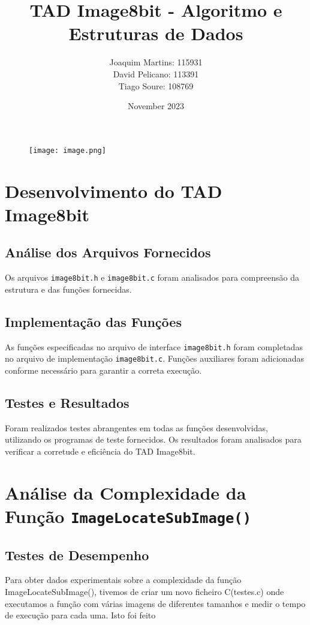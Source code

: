 \documentclass{article}
\title{TAD Image8bit - Algoritmo e Estruturas de Dados}
\author{
  Joaquim Martins: 115931 \\
  David Pelicano: 113391 \\
  Tiago Soure: 108769
}
\date{November 2023}
\begin{document}
\maketitle

\begin{figure}[H]
  \centering
  \texttt{[image: image.png]}
\end{figure}  

\newpage
\renewcommand\contentsname{Índice}
\tableofcontents 
\newpage


\section{Desenvolvimento do TAD Image8bit}

\subsection{Análise dos Arquivos Fornecidos}
Os arquivos \texttt{image8bit.h} e \texttt{image8bit.c} foram analisados para compreensão da estrutura e das funções fornecidas.

\subsection{Implementação das Funções}
As funções especificadas no arquivo de interface \texttt{image8bit.h} foram completadas no arquivo de implementação \texttt{image8bit.c}. Funções auxiliares foram adicionadas conforme necessário para garantir a correta execução.

\subsection{Testes e Resultados}
Foram realizados testes abrangentes em todas as funções desenvolvidas, utilizando os programas de teste fornecidos. Os resultados foram analisados para verificar a corretude e eficiência do TAD Image8bit.

\section{Análise da Complexidade da Função \texttt{ImageLocateSubImage()}}

\subsection{Testes de Desempenho}
Para obter dados experimentais sobre a complexidade da função ImageLocateSubImage(), tivemos de criar um novo ficheiro C(testes.c) onde executamos a função com várias imagens de diferentes tamanhos e medir o tempo 
de execução para cada uma. Isto foi feito 
\end{document}
